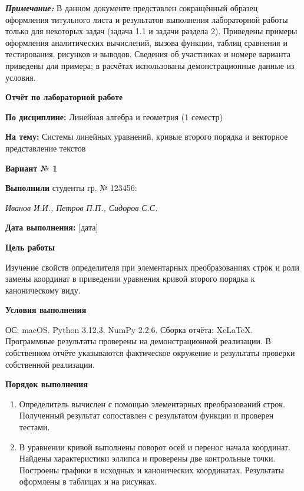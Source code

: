 \documentclass[12pt,a4paper]{article}
\newcommand{\taskhead}[1]{\par\textbf{#1}\par}
\begin{document}
\begin{titlepage}
{\color{black!50}
\textbf{\textit{Примечание:}} В данном документе представлен сокращённый
образец оформления титульного листа и результатов выполнения лабораторной
работы только для некоторых задач (задача 1.1 и задачи раздела 2).
Приведены примеры оформления аналитических вычислений, вызова функции,
таблиц сравнения и тестирования, рисунков и выводов.
Сведения об участниках и номере варианта приведены для примера;
в расчётах использованы демонстрационные данные из условия.
\par}

\vspace{2cm}
{\large\bfseries Отчёт по лабораторной работе\par}

\textbf{По дисциплине:} Линейная алгебра и геометрия (1 семестр)

\textbf{На тему:} Системы линейных уравнений, кривые второго порядка
и векторное представление текстов

\vspace{2cm}

\textbf{Вариант № 1}

\textbf{Выполнили} студенты гр. № 123456:

\textit{Иванов И.И., Петров П.П., Сидоров С.С.}

\textbf{Дата выполнения:} [дата]

\vspace{1cm}
\textbf{Цель работы}

Изучение свойств определителя при элементарных преобразованиях строк
и роли замены координат в приведении уравнения кривой второго порядка
к каноническому виду.

\vspace{0.8cm}
\textbf{Условия выполнения}

ОС: macOS. Python 3.12.3. NumPy 2.2.6. Сборка отчёта: XeLaTeX.
Программные результаты проверены на демонстрационной реализации.
В собственном отчёте указываются фактическое окружение и результаты
проверки собственной реализации.
\end{titlepage}

\taskhead{Порядок выполнения}
\begin{enumerate}
\item[1.1] Определитель вычислен с помощью элементарных преобразований строк.
Полученный результат сопоставлен с результатом функции и проверен тестами.
\item[2.1] В уравнении кривой выполнены поворот осей и перенос начала координат.
Найдены характеристики эллипса и проверены две контрольные точки.
Построены графики в исходных и канонических координатах.
Результаты оформлены в таблицах и на рисунках.
\end{enumerate}
\end{document}
